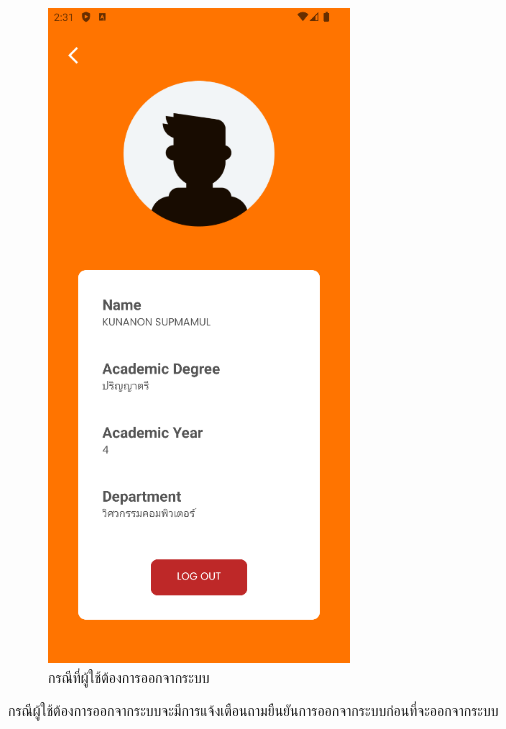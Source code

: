 \documentclass[14pt,oneside,openright,a4paper]{cpe-thai-project}
\begin{document}
\begin{figure}[!h]\centering
  \includegraphics[width=8cm]{./Pictures/outlog.png}
  \caption{กรณีที่ผู้ใช้ต้องการออกจากระบบ}\label{fig:LogoutTest}
\end{figure}
  \hspace*{1cm} กรณีผู้ใช้ต้องการออกจากระบบจะมีการแจ้งเตือนถามยืนยันการออกจากระบบก่อนที่จะออกจากระบบ

\newpage
\end{document}

